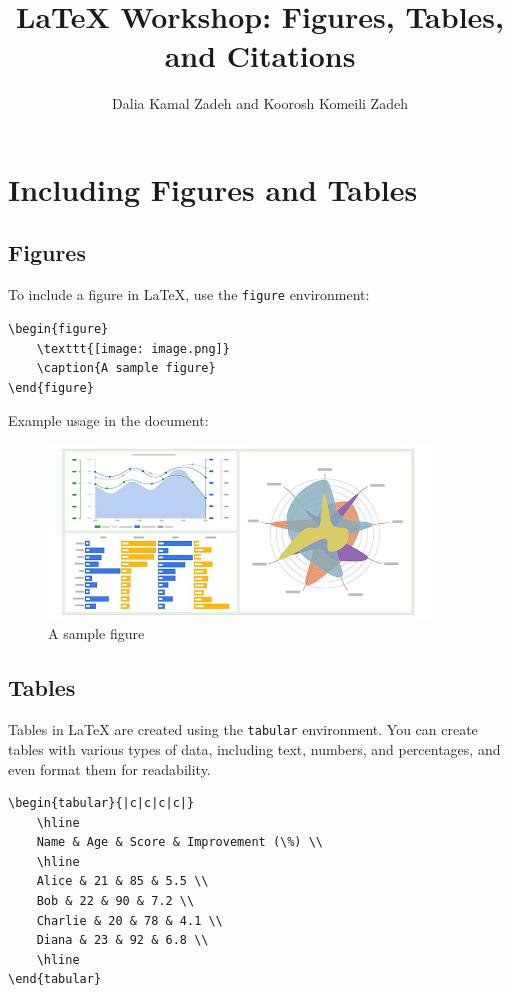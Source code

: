 \documentclass{article}
\begin{document}
\title{LaTeX Workshop: Figures, Tables, and Citations}
\author{Dalia Kamal Zadeh and Koorosh Komeili Zadeh}
\date{}
\maketitle

\section*{Including Figures and Tables}

\subsection*{Figures}
To include a figure in LaTeX, use the \texttt{figure} environment:
\begin{verbatim}
\begin{figure}
    \texttt{[image: image.png]}
    \caption{A sample figure}
\end{figure}
\end{verbatim}

Example usage in the document:
\begin{figure}[h]
    \centering
    \includegraphics[width=0.9\textwidth]{Figures/sample-chart} %
    \caption{A sample figure}
\end{figure}

\newpage

\subsection*{Tables}
Tables in LaTeX are created using the \texttt{tabular} environment. You can create tables with various types of data, including text, numbers, and percentages, and even format them for readability.

\begin{verbatim}
\begin{tabular}{|c|c|c|c|}
    \hline
    Name & Age & Score & Improvement (\%) \\
    \hline
    Alice & 21 & 85 & 5.5 \\
    Bob & 22 & 90 & 7.2 \\
    Charlie & 20 & 78 & 4.1 \\
    Diana & 23 & 92 & 6.8 \\
    \hline
\end{tabular}
\end{verbatim}
\end{document}
